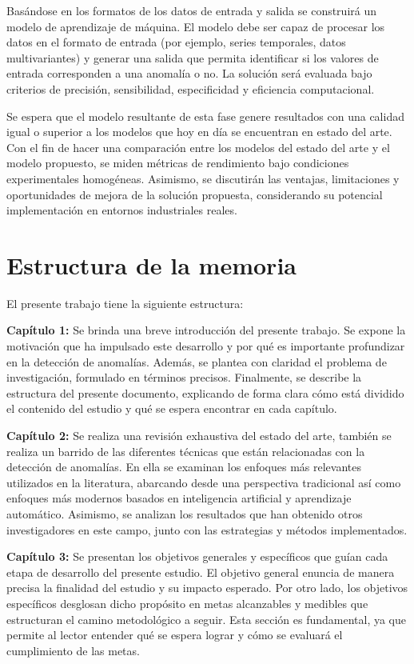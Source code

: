 \documentclass[11pt,a4paper,spanish]{book}
\numberwithin{equation}{chapter}
\numberwithin{figure}{chapter}
\begin{document}
Basándose en los formatos de los datos de entrada y salida se construirá un modelo 
de aprendizaje de máquina. 
El modelo debe ser capaz de procesar los datos en el formato de entrada 
(por ejemplo, series temporales, datos multivariantes) y generar una salida que permita
identificar si los valores de entrada corresponden a una anomalía o no. 
La solución será evaluada bajo criterios de precisión, sensibilidad, especificidad y 
eficiencia computacional.


Se espera que el modelo resultante de esta fase genere resultados con una calidad igual 
o superior a los modelos que hoy en día se encuentran en estado del  arte. Con el fin de
hacer una comparación entre los modelos del estado del arte y el modelo propuesto, se 
miden métricas de rendimiento bajo condiciones experimentales homogéneas. 
Asimismo, se discutirán las ventajas, limitaciones y oportunidades de mejora de la 
solución propuesta, considerando su potencial implementación en entornos industriales
reales.


\section{Estructura de la memoria}


El presente trabajo tiene la siguiente estructura:


\textbf{Capítulo 1:} Se brinda una breve introducción del presente trabajo. 
Se expone la motivación que ha impulsado este desarrollo y por qué es importante 
profundizar en la detección de anomalías. 
Además, se plantea con claridad el problema de investigación, formulado en términos 
precisos. 
Finalmente, se describe la estructura del presente documento, explicando de forma clara 
cómo está dividido el contenido del estudio y qué se espera encontrar en cada capítulo.


\textbf{Capítulo 2:} Se realiza una revisión exhaustiva del estado del arte, también se 
realiza un barrido de las diferentes técnicas que están relacionadas con la detección 
de anomalías. 
En ella se examinan los enfoques más relevantes utilizados en la literatura, abarcando 
desde una perspectiva tradicional así como enfoques más modernos basados en inteligencia 
artificial y aprendizaje automático. 
Asimismo, se analizan los resultados que han obtenido otros investigadores en este campo, 
junto con las estrategias y métodos implementados.


\textbf{Capítulo 3:} Se presentan los objetivos generales y específicos que guían cada 
etapa de desarrollo del presente estudio. 
El objetivo general enuncia de manera precisa la finalidad del estudio y su impacto 
esperado. 
Por otro lado, los objetivos específicos desglosan dicho propósito en metas alcanzables 
y medibles que estructuran el camino metodológico a seguir. 
Esta sección es fundamental, ya que permite al lector entender qué se espera lograr y 
cómo se evaluará el cumplimiento de las metas.
\end{document}
